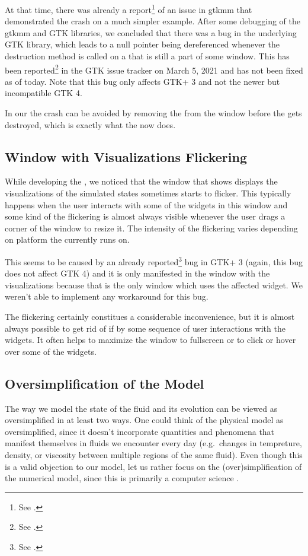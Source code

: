 \documentclass[11pt,a4paper,twoside,openright]{report}
\begin{document}
At that time, there was already a report\footnote{See \cite{GtkmmSwitchReport}.} of an issue in gtkmm that demonstrated the crash on a much simpler example. After some debugging of the gtkmm and GTK libraries, we concluded that there was a bug in the underlying GTK library, which leads to a null pointer being dereferenced whenever the destruction method is called on a  that is still a part of some window. This has been reported\footnote{See \cite{GtkSwitchReport}.} in the GTK issue tracker on March 5, 2021 and has not been fixed as of today. Note that this bug only affects GTK+ 3 and not the newer but incompatible GTK 4.

In our \software{} the crash can be avoided by removing the  from the window before the  gets destroyed, which is exactly what the \software{} now does.

\subsection{Window with Visualizations Flickering}
While developing the \software{}, we noticed that the window that shows displays the visualizations of the simulated states sometimes starts to flicker. This typically happens when the user interacts with some of the widgets in this window and some kind of the flickering is almost always visible whenever the user drags a corner of the window to resize it. The intensity of the flickering varies depending on platform the \software{} currently runs on.

This seems to be caused by an already reported\footnote{See \cite{GtkFlickerReport}.} bug in GTK+ 3 (again, this bug does not affect GTK 4) and it is only manifested in the window with the visualizations because that is the only window which uses the affected  widget. We weren't able to implement any workaround for this bug.

The flickering certainly constitues a considerable inconvenience, but it is almost always possible to get rid of if by some sequence of user interactions with the widgets. It often helps to maximize the window to fullscreen or to click or hover over some of the widgets.

\subsection{Oversimplification of the Model}
The way we model the state of the fluid and its evolution can be viewed as oversimplified in at least two ways. One could think of the physical model as oversimplified, since it doesn't incorporate quantities and phenomena that manifest themselves in fluids we encounter every day (e.g.\ changes in tempreture, density, or viscosity between multiple regions of the same fluid). Even though this is a valid objection to our model, let us rather focus on the (over)simplification of the numerical model, since this \this{} is primarily a computer science \this{}.
\end{document}
